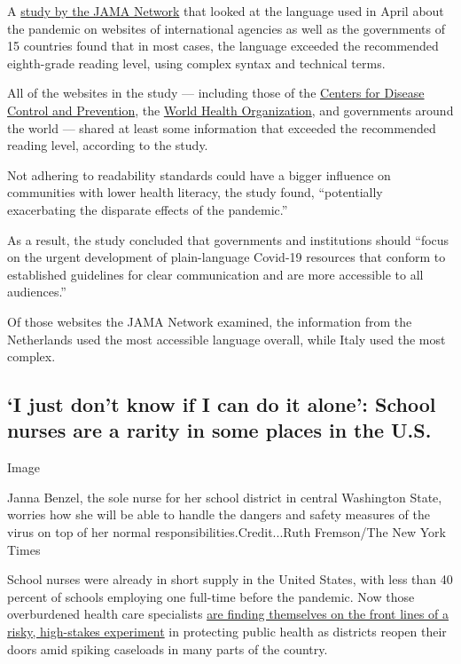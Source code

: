 A
\href{https://jamanetwork.com/journals/jamanetworkopen/fullarticle/2769382}{study
by the JAMA Network} that looked at the language used in April about the
pandemic on websites of international agencies as well as the
governments of 15 countries found that in most cases, the language
exceeded the recommended eighth-grade reading level, using complex
syntax and technical terms.

All of the websites in the study --- including those of the
\href{https://www.cdc.gov/}{Centers for Disease Control and Prevention},
the
\href{https://covid19.who.int/?gclid=EAIaIQobChMIpevM0cup6wIVOQiICR0tAQ2HEAAYASAAEgJMSfD_BwE}{World
Health Organization}, and governments around the world --- shared at
least some information that exceeded the recommended reading level,
according to the study.

Not adhering to readability standards could have a bigger influence on
communities with lower health literacy, the study found, ``potentially
exacerbating the disparate effects of the pandemic.''

As a result, the study concluded that governments and institutions
should ``focus on the urgent development of plain-language Covid-19
resources that conform to established guidelines for clear communication
and are more accessible to all audiences.''

Of those websites the JAMA Network examined, the information from the
Netherlands used the most accessible language overall, while Italy used
the most complex.

\hypertarget{i-just-dont-know-if-i-can-do-it-alone-school-nurses-are-a-rarity-in-some-places-in-the-us}{%
\subsection{`I just don't know if I can do it alone': School nurses are
a rarity in some places in the
U.S.}\label{i-just-dont-know-if-i-can-do-it-alone-school-nurses-are-a-rarity-in-some-places-in-the-us}}

Image

Janna Benzel, the sole nurse for her school district in central
Washington State, worries how she will be able to handle the dangers and
safety measures of the virus on top of her normal
responsibilities.Credit...Ruth Fremson/The New York Times

School nurses were already in short supply in the United States, with
less than 40 percent of schools employing one full-time before the
pandemic. Now those overburdened health care specialists
\href{https://www.nytimes3xbfgragh.onion/2020/08/20/us/schools-reopening-nurses-covid.html}{are
finding themselves on the front lines of a risky, high-stakes
experiment} in protecting public health as districts reopen their doors
amid spiking caseloads in many parts of the country.

